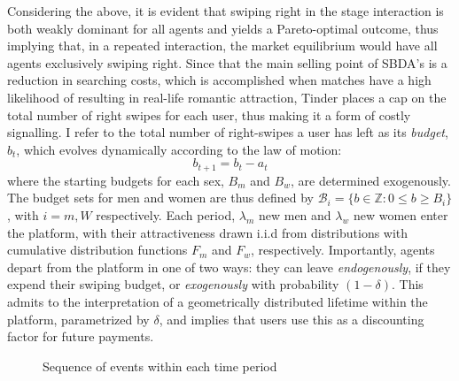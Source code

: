 Considering the above, it is evident that swiping right in the stage interaction is both weakly dominant for all agents and yields a Pareto-optimal outcome, thus implying that, in a repeated interaction, the market equilibrium would have all agents exclusively swiping right. Since that the main selling point of SBDA's is a reduction in searching costs, which is accomplished when matches have a high likelihood of resulting in real-life romantic attraction, Tinder places a cap on the total number of right swipes for each user, thus making it a form of costly signalling. I refer to the total number of right-swipes a user has left as its \textit{budget}, $b_t$, which evolves dynamically according to the law of motion:
$$
  b_{t+1}= b_{t}- a_{t}
$$
where the starting budgets for each sex, $B_m$ and $B_w$, are determined exogenously. The budget sets for men and women are thus defined by $\mathcal{B}_{i}=\{b \in \mathbb{Z} : 0\leq b \geq B_i\}$, with $i=m,W$ respectively. Each period, $\lambda_m$ new men and $\lambda_w$ new women enter the platform, with their attractiveness drawn i.i.d from distributions with cumulative distribution functions $F_m$ and $F_w$, respectively. Importantly, agents depart from the platform in one of two ways: they can leave \textit{endogenously}, if they expend their swiping budget, or \textit{exogenously} with probability $(1-\delta)$. This admits to the interpretation of a geometrically distributed lifetime within the platform, parametrized by $\delta$, and implies that users use this as a discounting factor for future payments.

\begin{figure}[ht]
    \centering
    \caption{Sequence of events within each time period} \label{fig:timeline}
\end{figure}

